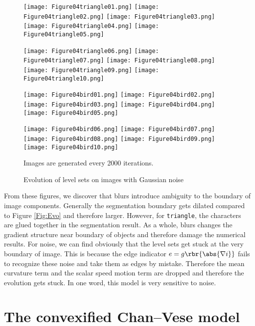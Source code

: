 \documentclass[english, nochinese]{pnote}
\begin{document}
\begin{figure}[htbp]
{
\centering

\texttt{[image: Figure04triangle01.png]}
\texttt{[image: Figure04triangle02.png]}
\texttt{[image: Figure04triangle03.png]}
\texttt{[image: Figure04triangle04.png]}
\texttt{[image: Figure04triangle05.png]}

\texttt{[image: Figure04triangle06.png]}
\texttt{[image: Figure04triangle07.png]}
\texttt{[image: Figure04triangle08.png]}
\texttt{[image: Figure04triangle09.png]}
\texttt{[image: Figure04triangle10.png]}

\texttt{[image: Figure04bird01.png]}
\texttt{[image: Figure04bird02.png]}
\texttt{[image: Figure04bird03.png]}
\texttt{[image: Figure04bird04.png]}
\texttt{[image: Figure04bird05.png]}

\texttt{[image: Figure04bird06.png]}
\texttt{[image: Figure04bird07.png]}
\texttt{[image: Figure04bird08.png]}
\texttt{[image: Figure04bird09.png]}
\texttt{[image: Figure04bird10.png]}

\caption{Evolution of level sets on images with Gaussian noise}
\label{Fig:Noise}
}
{
\footnotesize Images are generated every 2000 iterations.
}
\end{figure}

From these figures, we discover that blurs introduce ambiguity to the boundary of image components. Generally the segmentation boundary gets dilated compared to Figure \ref{Fig:Evo} and therefore larger. However, for \verb"triangle", the characters are glued together in the segmentation result. As a whole, blurs changes the gradient structure near boundary of objects and therefore damage the numerical results. For noise, we can find obviously that the level sets get stuck at the very boundary of image. This is because the edge indicator $ e = g \rbr{\abs{ \nabla i }} $ fails to recognize these noise and take them as edges by mistake. Therefore the mean curvature term and the scalar speed motion term are dropped and therefore the evolution gets stuck. In one word, this model is very sensitive to noise.

\section{The convexified Chan--Vese model}
\end{document}
